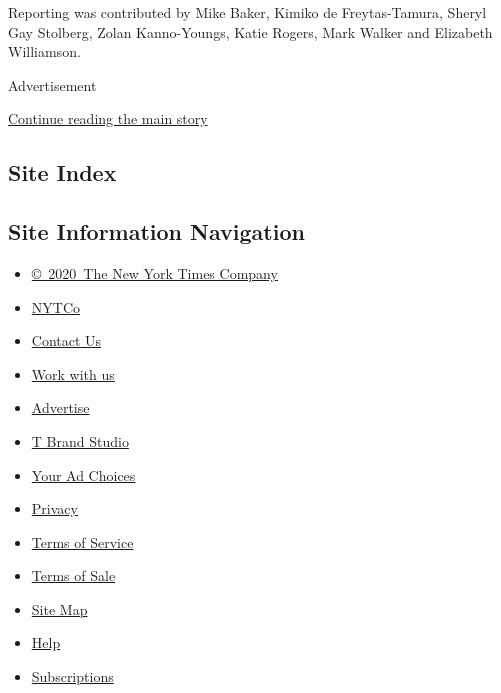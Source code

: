 Reporting was contributed by Mike Baker, Kimiko de Freytas-Tamura,
Sheryl Gay Stolberg, Zolan Kanno-Youngs, Katie Rogers, Mark Walker and
Elizabeth Williamson.

Advertisement

\protect\hyperlink{after-bottom}{Continue reading the main story}

\hypertarget{site-index}{%
\subsection{Site Index}\label{site-index}}

\hypertarget{site-information-navigation}{%
\subsection{Site Information
Navigation}\label{site-information-navigation}}

\begin{itemize}
\tightlist
\item
  \href{https://help.nytimes.com/hc/en-us/articles/115014792127-Copyright-notice}{©~2020~The
  New York Times Company}
\end{itemize}

\begin{itemize}
\tightlist
\item
  \href{https://www.nytco.com/}{NYTCo}
\item
  \href{https://help.nytimes.com/hc/en-us/articles/115015385887-Contact-Us}{Contact
  Us}
\item
  \href{https://www.nytco.com/careers/}{Work with us}
\item
  \href{https://nytmediakit.com/}{Advertise}
\item
  \href{http://www.tbrandstudio.com/}{T Brand Studio}
\item
  \href{https://www.nytimes.com/privacy/cookie-policy\#how-do-i-manage-trackers}{Your
  Ad Choices}
\item
  \href{https://www.nytimes.com/privacy}{Privacy}
\item
  \href{https://help.nytimes.com/hc/en-us/articles/115014893428-Terms-of-service}{Terms
  of Service}
\item
  \href{https://help.nytimes.com/hc/en-us/articles/115014893968-Terms-of-sale}{Terms
  of Sale}
\item
  \href{https://spiderbites.nytimes.com}{Site Map}
\item
  \href{https://help.nytimes.com/hc/en-us}{Help}
\item
  \href{https://www.nytimes.com/subscription?campaignId=37WXW}{Subscriptions}
\end{itemize}
